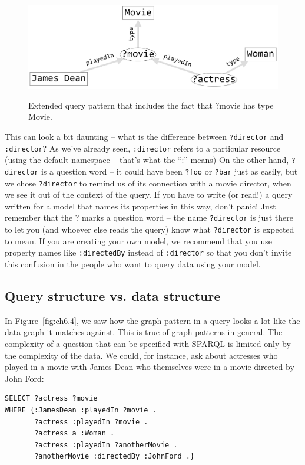 \begin{figure}
\centering
\includegraphics[width=5in]{SWWOv3/media/ch6/figure6-5.png}
\label{fig:ch6.5}
\caption{Extended query pattern that includes the fact that ?movie has type Movie.
}
\end{figure}

This can look a bit daunting -- what is the difference between \texttt{?director}
and \texttt{:director}? As we've already seen, \texttt{:director} refers to a particular
resource (using the default namespace -- that's what the ``:'' means) On
the other hand, \texttt{?director} is a question word -- it could have been \texttt{?foo}
or \texttt{?bar} just as easily, but we chose \texttt{?director} to remind us of its
connection with a movie director, when we see it out of the context of
the query. If you have to write (or read!) a query written for a model
that names its properties in this way, don't panic! Just remember that
the ? marks a question word -- the name \texttt{?director} is just there to let
you (and whoever else reads the query) know what \texttt{?director} is expected
to mean. If you are creating your own model, we recommend that you use
property names like \texttt{:directedBy} instead of \texttt{:director} so that you don't
invite this confusion in the people who want to query data using your
model.

\subsection{Query structure vs. data structure}

In Figure~\ref{fig:ch6.4}, we saw how the graph pattern in a query looks a lot like
the data graph it matches against. This is true of graph patterns in
general. The complexity of a question that can be specified with SPARQL
is limited only by the complexity of the data. We could, for instance,
ask about actresses who played in a movie with James Dean who themselves
were in a movie directed by John Ford:

\begin{lstlisting}
SELECT ?actress ?movie
WHERE {:JamesDean :playedIn ?movie .
       ?actress :playedIn ?movie .
       ?actress a :Woman .
       ?actress :playedIn ?anotherMovie .
       ?anotherMovie :directedBy :JohnFord .}
\end{lstlisting}

